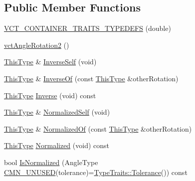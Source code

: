 \subsection*{Public Member Functions}
\begin{DoxyCompactItemize}
\item 
\hyperlink{classvct_angle_rotation2_a1e46485e0de755434c239e3b8d10eebc}{V\-C\-T\-\_\-\-C\-O\-N\-T\-A\-I\-N\-E\-R\-\_\-\-T\-R\-A\-I\-T\-S\-\_\-\-T\-Y\-P\-E\-D\-E\-F\-S} (double)
\item 
\hyperlink{classvct_angle_rotation2_a82335f217a852c3a9abac0f0c5766286}{vct\-Angle\-Rotation2} ()
\item 
\hyperlink{classvct_angle_rotation2_a67339254f084f89c13aca70c1242d18e}{This\-Type} \& \hyperlink{classvct_angle_rotation2_a16c50a586a3f30702d45eb7db7ae0f48}{Inverse\-Self} (void)
\item 
\hyperlink{classvct_angle_rotation2_a67339254f084f89c13aca70c1242d18e}{This\-Type} \& \hyperlink{classvct_angle_rotation2_a31299d9b956651c84b284c8951480e89}{Inverse\-Of} (const \hyperlink{classvct_angle_rotation2_a67339254f084f89c13aca70c1242d18e}{This\-Type} \&other\-Rotation)
\item 
\hyperlink{classvct_angle_rotation2_a67339254f084f89c13aca70c1242d18e}{This\-Type} \hyperlink{classvct_angle_rotation2_af20c0aeb44ed810060eac9c068cac40f}{Inverse} (void) const 
\item 
\hyperlink{classvct_angle_rotation2_a67339254f084f89c13aca70c1242d18e}{This\-Type} \& \hyperlink{classvct_angle_rotation2_a88280cb00aa3ed012e4c30690f7a509e}{Normalized\-Self} (void)
\item 
\hyperlink{classvct_angle_rotation2_a67339254f084f89c13aca70c1242d18e}{This\-Type} \& \hyperlink{classvct_angle_rotation2_a30a34d99f9b530eedede7c7ff664941f}{Normalized\-Of} (const \hyperlink{classvct_angle_rotation2_a67339254f084f89c13aca70c1242d18e}{This\-Type} \&other\-Rotation)
\item 
\hyperlink{classvct_angle_rotation2_a67339254f084f89c13aca70c1242d18e}{This\-Type} \hyperlink{classvct_angle_rotation2_afb448f3b070001d1afd4d98b49ab2b47}{Normalized} (void) const 
\item 
bool \hyperlink{classvct_angle_rotation2_a11736c57bdb0c868dee69540e6142758}{Is\-Normalized} (Angle\-Type \hyperlink{cmn_portability_8h_a021894e2626935fa2305434b1e893ff6}{C\-M\-N\-\_\-\-U\-N\-U\-S\-E\-D}(tolerance)=\hyperlink{classcmn_type_traits_adc129bf9867295b90d300768b780fa99}{Type\-Traits\-::\-Tolerance}()) const 
\item 

\end{DoxyCompactItemize}
